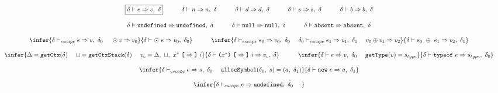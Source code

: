 \documentclass[11pt]{article}
\newcommand{\Term}[1]{\texttt{#1}}
\newcommand{\cs}[0]{\quad}
\newcommand{\symstate}[0]{\delta}
\newcommand{\symctx}[0]{\Delta}
\newcommand{\symctxstack}[0]{\sqcup}
\newcommand{\symuop}[0]{\odot}
\newcommand{\symbop}[0]{\oplus}
\newcommand{\evaluop}[2]{\symuop #1 \Rightarrow #2}
\newcommand{\evalbop}[3]{#1 \symbop #2 \Rightarrow #3}
\newcommand{\evalexpr}[4]{#1 \vdash #2 \Rightarrow #3,\ #4}
\newcommand{\evalescexpr}[4]{#1 \vdash_{escape} #2 \Rightarrow #3,\ #4}
\begin{document}
\[
\begin{array}{c}
\multicolumn{1}{c}{\begin{array}{ccccccccc}
\fbox{$\evalexpr{\symstate}{e}{v}{\symstate}$}
&
\cs
&
\evalexpr{\symstate}{n}{n}{\symstate}
&
\cs
&
\evalexpr{\symstate}{d}{d}{\symstate}
&
\cs
&
\evalexpr{\symstate}{s}{s}{\symstate}
&
\cs
&
\evalexpr{\symstate}{b}{b}{\symstate}
\end{array}}
\\ \\
\multicolumn{1}{c}{\begin{array}{ccccc}
\evalexpr{\symstate}{\Term{undefined}}{\Term{undefined}}{\symstate}
&
\cs
&
\evalexpr{\symstate}{\Term{null}}{\Term{null}}{\symstate}
&
\cs
&
\evalexpr{\symstate}{\Term{absent}}{\Term{absent}}{\symstate}
\end{array}}
\\ \\
\multicolumn{1}{c}{\begin{array}{ccc}
\infer
{\evalescexpr{\symstate}{e}{v}{\symstate_0}\ \ \ \
\evaluop{v}{v_0}}
{\evalexpr{\symstate}{\odot\ e}{v_0}{\symstate_0}}
&
\cs
&
\infer
{\evalescexpr{\symstate}{e_0}{v_0}{\symstate_0}\ \ \ \
\evalescexpr{\symstate_0}{e_1}{v_1}{\symstate_1}\ \ \ \
\evalbop{v_0}{v_1}{v_2}}
{\evalexpr{\symstate}{e_0\ \oplus\ e_1}{v_2}{\symstate_1}}
\end{array}}
\\ \\
\multicolumn{1}{c}{\begin{array}{ccc}
\infer
{\symctx = \Term{getCtx}(\symstate) \ \ \ \
\symctxstack = \Term{getCtxStack}(\symstate) \ \ \ \
v_{c} = \symctx,\ \symctxstack,\ x^*\ \Term{[} \Rightarrow \Term{]}\ i}
{\evalexpr{\symstate}
{\Term{(} x^* \Term{)}\ \Term{[} \Rightarrow \Term{]}\ i}
{v_c}{\symstate}}
&
\cs
&
\infer
{\evalexpr{\symstate}{e}{v}{\symstate_0}\ \ \ \
\Term{getType}(v)=s_{type}}
{\evalexpr{\symstate}{\Term{typeof}\ e}{s_{type}}{\symstate_0}}
\end{array}}
\\ \\
\infer
{\evalescexpr{\symstate}{e}{s}{\symstate_0}\ \ \ \
\Term{allocSymbol}(\symstate_0,\ s) = (a,\ \symstate_1)}
{\evalexpr{\symstate}{\Term{new}\ e}{a}{\symstate_1}}
\\ \\ 
\infer
{\evalescexpr{\symstate}{e}{\Term{undefined}}{\symstate_0}\ \ \ \
}
\end{array}\]
\end{document}
